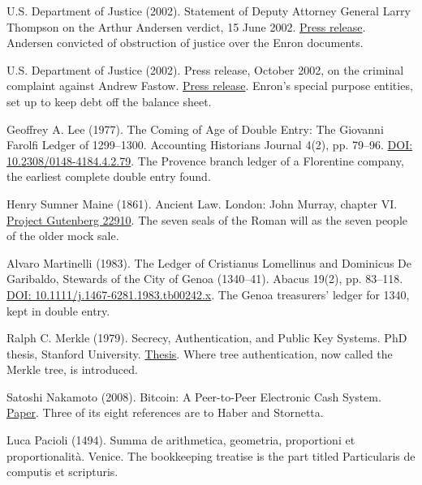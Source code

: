 \documentclass[11pt,twoside]{article}
\theoremstyle{thielethm}
\theoremstyle{thieledef}
\theoremstyle{thieledef}
\theoremstyle{thieledef}
\theoremstyle{thielethm}
\theoremstyle{thieleobs}
\theoremstyle{thielethm}
\begin{document}
\noindent U.S. Department of Justice (2002). Statement of Deputy Attorney General Larry Thompson on the Arthur Andersen verdict, 15 June 2002. \href{https://www.justice.gov/archive/opa/pr/2002/June/02_dag_356.htm}{Press release}. Andersen convicted of obstruction of justice over the Enron documents.
\par\medskip

\noindent U.S. Department of Justice (2002). Press release, October 2002, on the criminal complaint against Andrew Fastow. \href{https://www.justice.gov/archive/opa/pr/2002/October/02_crm_568.htm}{Press release}. Enron's special purpose entities, set up to keep debt off the balance sheet.
\par\medskip

\noindent Geoffrey A. Lee (1977). The Coming of Age of Double Entry: The Giovanni Farolfi Ledger of 1299--1300. Accounting Historians Journal 4(2), pp. 79--96. \href{https://doi.org/10.2308/0148-4184.4.2.79}{DOI: 10.2308/0148-4184.4.2.79}. The Provence branch ledger of a Florentine company, the earliest complete double entry found.
\par\medskip

\noindent Henry Sumner Maine (1861). Ancient Law. London: John Murray, chapter VI. \href{https://www.gutenberg.org/ebooks/22910}{Project Gutenberg 22910}. The seven seals of the Roman will as the seven people of the older mock sale.
\par\medskip

\noindent Alvaro Martinelli (1983). The Ledger of Cristianus Lomellinus and Dominicus De Garibaldo, Stewards of the City of Genoa (1340--41). Abacus 19(2), pp. 83--118. \href{https://doi.org/10.1111/j.1467-6281.1983.tb00242.x}{DOI: 10.1111/j.1467-6281.1983.tb00242.x}. The Genoa treasurers' ledger for 1340, kept in double entry.
\par\medskip

\noindent Ralph C. Merkle (1979). Secrecy, Authentication, and Public Key Systems. PhD thesis, Stanford University. \href{https://www.ralphmerkle.com/papers/Thesis1979.pdf}{Thesis}. Where tree authentication, now called the Merkle tree, is introduced.
\par\medskip

\noindent Satoshi Nakamoto (2008). Bitcoin: A Peer-to-Peer Electronic Cash System. \href{https://bitcoin.org/bitcoin.pdf}{Paper}. Three of its eight references are to Haber and Stornetta.
\par\medskip

\noindent Luca Pacioli (1494). Summa de arithmetica, geometria, proportioni et proportionalit\`a. Venice. The bookkeeping treatise is the part titled Particularis de computis et scripturis.
\par\medskip
\end{document}
